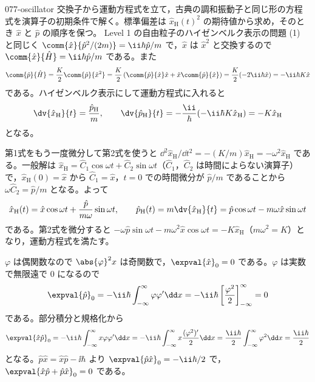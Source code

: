 \documentclass[uplatex,dvipdfmx,a4paper,11pt]{jsarticle}
\begin{document}
\begin{kaisetsu}{077-oscillator}
\houshin 交換子から運動方程式を立て，古典の調和振動子と同じ形の方程式を演算子の初期条件で解く。標準偏差は $\hat{x}_{\mathrm{H}}(t)^{2}$ の期待値から求め，そのとき $\hat{x}$ と $\hat{p}$ の順序を保つ。
\keisan {} Level 1 の自由粒子のハイゼンベルク表示の問題 (1) と同じく $\comm{\hat{x}}{\hat{p}^{2}/(2m)}=\ii\hbar\hat{p}/m$ で，$\hat{x}$ は $\hat{x}^{2}$ と交換するので $\comm{\hat{x}}{\hat{H}}=\ii\hbar\hat{p}/m$ である。また
\[ \comm{\hat{p}}{\hat{H}}=\frac{K}{2}\comm{\hat{p}}{\hat{x}^{2}}=\frac{K}{2}\left(\comm{\hat{p}}{\hat{x}}\hat{x}+\hat{x}\comm{\hat{p}}{\hat{x}}\right)=\frac{K}{2}(-2\ii\hbar\hat{x})=-\ii\hbar K\hat{x} \]
である。ハイゼンベルク表示にして運動方程式に入れると
\[ \dv{\hat{x}_{\mathrm{H}}}{t}=\frac{\hat{p}_{\mathrm{H}}}{m},\qquad \dv{\hat{p}_{\mathrm{H}}}{t}=-\frac{\ii}{\hbar}(-\ii\hbar K\hat{x}_{\mathrm{H}})=-K\hat{x}_{\mathrm{H}} \]
となる。

 第1式をもう一度微分して第2式を使うと $\dd^{2}\hat{x}_{\mathrm{H}}/\dd t^{2}=-(K/m)\hat{x}_{\mathrm{H}}=-\omega^{2}\hat{x}_{\mathrm{H}}$ である。一般解は $\hat{x}_{\mathrm{H}}=\hat{C}_{1}\cos\omega t+\hat{C}_{2}\sin\omega t$（$\hat{C}_{1}$，$\hat{C}_{2}$ は時間によらない演算子）で，$\hat{x}_{\mathrm{H}}(0)=\hat{x}$ から $\hat{C}_{1}=\hat{x}$，$t=0$ での時間微分が $\hat{p}/m$ であることから $\omega\hat{C}_{2}=\hat{p}/m$ となる。よって
\[ \hat{x}_{\mathrm{H}}(t)=\hat{x}\cos\omega t+\frac{\hat{p}}{m\omega}\sin\omega t,\qquad \hat{p}_{\mathrm{H}}(t)=m\dv{\hat{x}_{\mathrm{H}}}{t}=\hat{p}\cos\omega t-m\omega\hat{x}\sin\omega t \]
である。第2式を微分すると $-\omega\hat{p}\sin\omega t-m\omega^{2}\hat{x}\cos\omega t=-K\hat{x}_{\mathrm{H}}$（$m\omega^{2}=K$）となり，運動方程式を満たす。

 $\varphi$ は偶関数なので $\abs{\varphi}^{2}x$ は奇関数で，$\expval{\hat{x}}_{0}=0$ である。$\varphi$ は実数で無限遠で $0$ になるので
\[ \expval{\hat{p}}_{0}=-\ii\hbar\int_{-\infty}^{\infty}\varphi\varphi'\dd x=-\ii\hbar\left[\frac{\varphi^{2}}{2}\right]_{-\infty}^{\infty}=0 \]
である。部分積分と規格化から
\[ \expval{\hat{x}\hat{p}}_{0}=-\ii\hbar\int_{-\infty}^{\infty}x\varphi\varphi'\dd x=-\ii\hbar\int_{-\infty}^{\infty}x\frac{(\varphi^{2})'}{2}\dd x=\frac{\ii\hbar}{2}\int_{-\infty}^{\infty}\varphi^{2}\dd x=\frac{\ii\hbar}{2} \]
となる。$\hat{p}\hat{x}=\hat{x}\hat{p}-\ii\hbar$ より $\expval{\hat{p}\hat{x}}_{0}=-\ii\hbar/2$ で，$\expval{\hat{x}\hat{p}+\hat{p}\hat{x}}_{0}=0$ である。


\end{kaisetsu}
\end{document}
